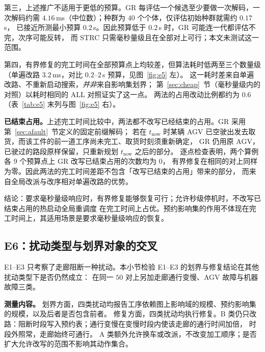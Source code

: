\documentclass[manuscript,screen,review]{acmart}
\providecommand{\STRC}{\textsc{STRC}}
\newcommand{\NPairs}{50}
\newcommand{\MsRepairMed}{3.2}
\newcommand{\RzeroPastLo}{0}
\newcommand{\MsRedecode}{4.16}       %
\begin{document}
第三，上述推广不适用于更低的预算。GR 每评估一个候选至少要做一次解码，一次解码约需
\(\MsRedecode\)\,ms（中位数）；种群为 \(40\) 个个体，仅评估初始种群就需约 \(0.17\)\,s，
已接近所测最小预算 \(0.2\)\,s。因此预算低于 \(0.2\)\,s 时，GR 可能连一代都评估不完，次序可能反转，
而 \STRC{} 只需毫秒量级且在全部对上可行；本文未测试这一范围。

第四，有界修复的完工时间在全部预算点上均较差，但算法耗时低两至三个数量级
（单遍改路 \(\MsRepairMed\)\,ms，对比 \(0.2\)--\(2\)\,s 预算，见图~\ref{fig:e5} 左）。
这一耗时差来自单遍改路、不重新启动搜索，\emph{并非}来自影响集划界；
第~\ref{sec:cheap}~节（毫秒量级内的对照）以耗时相同的 ALL 对照证实了这一点。
两法的占用改动比例都约为 \(0.6\)（表~\ref{tab:e5} 末列与图~\ref{fig:e5} 右）。

\textbf{已结束占用。}上述完工时间比较中，两法都不改写已经结束的占用。GR 采用第~\ref{sec:afault}~节定义的固定前缀解码；
若在 \(t_{\mathrm{now}}\) 时某辆 AGV 已空驶出发去取货，而该工件的前一道工序尚未完工、取货时刻须重新确定，
GR 仍用原 AGV，已驶过的路段原样保留，只重新规划 \(t_{\mathrm{now}}\) 之后的部分。
逐点检查表明，两个算例各 \(9\) 个预算点上 GR 改写已结束占用的次数均为 \(\RzeroPastLo\)，
有界修复在相同的对上同样为零。因此两法的完工时间差距不包含「改写已结束的占用」带来的部分，
而来自全局改派与改序相对单遍改路的优势。

结论：要求毫秒量级响应时，有界修复能够恢复可行；允许秒级停机时，不改写已结束占用的热启动全局重调度
在完工时间上占优。预约影响集的作用不体现在完工时间上，其适用场景是要求毫秒量级响应的恢复。

\subsection{E6：扰动类型与划界对象的交叉}
\label{sec:e6}

E1--E3 只考察了走廊阻断一种扰动。本小节检验 E1--E3 的划界与修复结论在其他扰动类型下是否仍然成立：
在同一 \(\NPairs\) 对上另加走廊通行变慢、AGV 故障与机器故障三类。

\textbf{测量内容。} 划界方面，四类扰动均报告工序依赖图上影响域的规模、预约影响集的规模，以及后者是否包含前者。
修复方面，四类扰动均执行修复。B 类仍只改路：阻断时段写入预约表；通行变慢在变慢时段内使该走廊的通行时间加倍，
时段外照常，走廊始终可通行。
A 类额外允许换车或改派，不改变加工顺序；是否扩大允许改写的范围不影响其动作集合。
\end{document}
